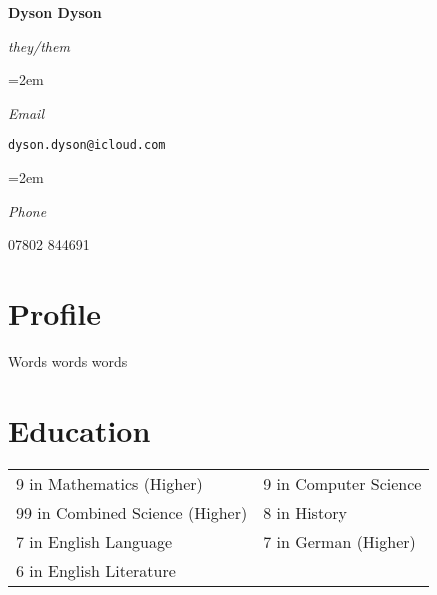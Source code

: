\documentclass[a4paper, 12pt]{article}
\newlength{\spacebox}
\newcommand{\sepspace}{\vspace*{1em}}
\newcommand{\name}[1]{
	\Huge
	\begin{center}\textbf{#1}\end{center}\par
	\normalsize}
\newcommand{\pronouns}[1]{
	\normalsize
	\begin{center}\textsl{#1}\end{center}\par}
\newcommand{\info}[2]{
	\noindent\hangindent=2em\hangafter=0
	\parbox{\spacebox}{%
		\textsl{#1}}
	#2\par}
\begin{document}
\name{Dyson Dyson}
\vspace*{-1.5em}
\pronouns{they/them}

\sepspace

\info{Email}{\texttt{dyson.dyson@icloud.com}}
\info{Phone}{07802 844691}

\section*{Profile}
Words words words


\section*{Education}

\begin{center}
\end{center}

\begin{center}
	\begin{tabular}{m{16em} m{10em}}
		9 in Mathematics (Higher) & 9 in Computer Science \\
		99 in Combined Science (Higher) & 8 in History \\
		7 in English Language & 7 in German (Higher) \\
		6 in English Literature
	\end{tabular}
\end{center}
\end{document}
